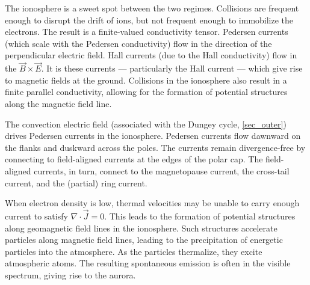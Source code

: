The ionosphere is a sweet spot between the two regimes. Collisions are frequent
enough to disrupt the drift of ions, but not frequent enough to immobilize the
electrons. The result is a finite-valued conductivity tensor. Pedersen currents
(which scale with the Pedersen conductivity) flow in the direction of the
perpendicular electric field. Hall currents (due to the Hall conductivity) flow
in the $\vec{B} \times \vec{E}$. It is these currents --- particularly the Hall
current --- which give rise to magnetic fields at the ground. Collisions in the
ionosphere also result in a finite parallel conductivity, allowing for the
formation of potential structures along the magnetic field line. 


The convection electric field (associated with the Dungey cycle,
\cref{sec_outer}) drives Pedersen currents in the ionosphere. Pedersen currents
flow dawnward on the flanks and duskward across the poles. The currents remain
divergence-free by connecting to field-aligned currents at the edges of the
polar cap. The field-aligned currents, in turn, connect to the magnetopause
current, the cross-tail current, and the (partial) ring current. 

When electron density is low, thermal velocities may be unable to carry enough
current to satisfy $\nabla \cdot \vec{J} = 0$. This leads to the formation of
potential structures along geomagnetic field lines in the ionosphere. Such
structures accelerate particles along magnetic field lines, leading to the
precipitation of energetic particles into the atmosphere. As the particles
thermalize, they excite atmospheric atoms. The resulting spontaneous emission
is often in the visible spectrum, giving rise to the aurora. 



